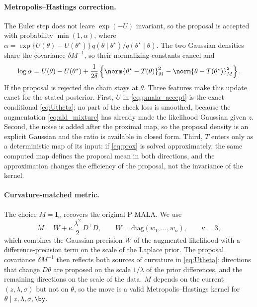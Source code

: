 \paragraph{Metropolis--Hastings correction.} The Euler step does not leave $\exp(-U)$ invariant, so the proposal is accepted with probability $\min(1,\alpha)$, where $\alpha = \exp\{U(\theta) - U(\theta^\star)\}\, q(\theta \mid \theta^\star)/q(\theta^\star \mid \theta)$. The two Gaussian densities share the covariance $\delta M^{-1}$, so their normalizing constants cancel and
\begin{equation}
    \log \alpha = U(\theta) - U(\theta^\star) + \frac{1}{2\delta}\left\{ \norm{\theta^\star - T(\theta)}_M^2 - \norm{\theta - T(\theta^\star)}_M^2 \right\}.
    \label{eq:pmala_accept}
\end{equation}
If the proposal is rejected the chain stays at $\theta$. Three features make this update exact for the stated posterior. First, $U$ in \eqref{eq:pmala_accept} is the exact conditional \eqref{eq:Utheta}; no part of the check loss is smoothed, because the augmentation \eqref{eq:ald_mixture} has already made the likelihood Gaussian given $z$. Second, the noise is added after the proximal map, so the proposal density is an explicit Gaussian and the ratio is available in closed form. Third, $T$ enters only as a deterministic map of its input: if \eqref{eq:prox} is solved approximately, the same computed map defines the proposal mean in both directions, and the approximation changes the efficiency of the proposal, not the invariance of the kernel.

\paragraph{Curvature-matched metric.} The choice $M = \mathbf{I}_n$ recovers the original P-MALA. We use
\begin{equation}
    M = W + \kappa\, \frac{\lambda^2}{2}\, D^\top D, \qquad W = \mathrm{diag}(w_1, \ldots, w_n), \qquad \kappa = 3,
    \label{eq:metric}
\end{equation}
which combines the Gaussian precision $W$ of the augmented likelihood with a difference-precision term on the scale of the Laplace prior. The proposal covariance $\delta M^{-1}$ then reflects both sources of curvature in \eqref{eq:Utheta}: directions that change $D\theta$ are proposed on the scale $1/\lambda$ of the prior differences, and the remaining directions on the scale of the data. $M$ depends on the current $(z, \lambda, \sigma)$ but not on $\theta$, so the move is a valid Metropolis--Hastings kernel for $\theta \mid z, \lambda, \sigma, \by$.

